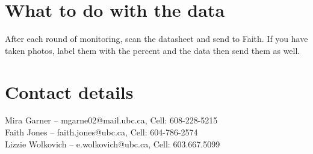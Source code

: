 \documentclass[11pt,letter]{article}
\begin{document}
\section{What to do with the data}
After each round of monitoring, scan the datasheet and send to Faith. If you have taken photos, label them with the percent and the data then send them as well.

\section{Contact details}
Mira Garner -- mgarne02@mail.ubc.ca, Cell: 608-228-5215\\
Faith Jones -- faith.jones@ubc.ca, Cell: 604-786-2574\\
Lizzie Wolkovich -- e.wolkovich@ubc.ca, Cell: 603.667.5099\\
\end{document}
